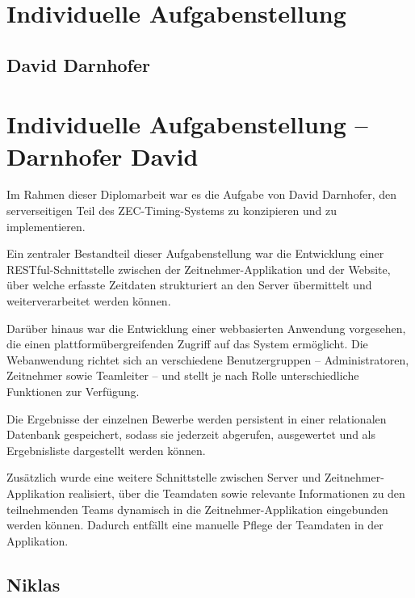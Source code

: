 
\section{Individuelle Aufgabenstellung}


\subsection{David Darnhofer}

\section*{Individuelle Aufgabenstellung -- Darnhofer David}

Im Rahmen dieser Diplomarbeit war es die Aufgabe von David Darnhofer, 
den serverseitigen Teil des ZEC-Timing-Systems zu konzipieren und zu implementieren.

Ein zentraler Bestandteil dieser Aufgabenstellung war die Entwicklung einer 
RESTful-Schnittstelle zwischen der Zeitnehmer-Applikation und der Website, 
über welche erfasste Zeitdaten strukturiert an den Server übermittelt und 
weiterverarbeitet werden können.

Darüber hinaus war die Entwicklung einer webbasierten Anwendung vorgesehen, 
die einen plattformübergreifenden Zugriff auf das System ermöglicht. Die 
Webanwendung richtet sich an verschiedene Benutzergruppen -- Administratoren, 
Zeitnehmer sowie Teamleiter -- und stellt je nach Rolle unterschiedliche 
Funktionen zur Verfügung.

Die Ergebnisse der einzelnen Bewerbe werden persistent in einer relationalen 
Datenbank gespeichert, sodass sie jederzeit abgerufen, ausgewertet und als 
Ergebnisliste dargestellt werden können.

Zusätzlich wurde eine weitere Schnittstelle zwischen Server und 
Zeitnehmer-Applikation realisiert, über die Teamdaten sowie relevante 
Informationen zu den teilnehmenden Teams dynamisch in die 
Zeitnehmer-Applikation eingebunden werden können. Dadurch entfällt eine 
manuelle Pflege der Teamdaten in der Applikation.

\subsection{Niklas}

